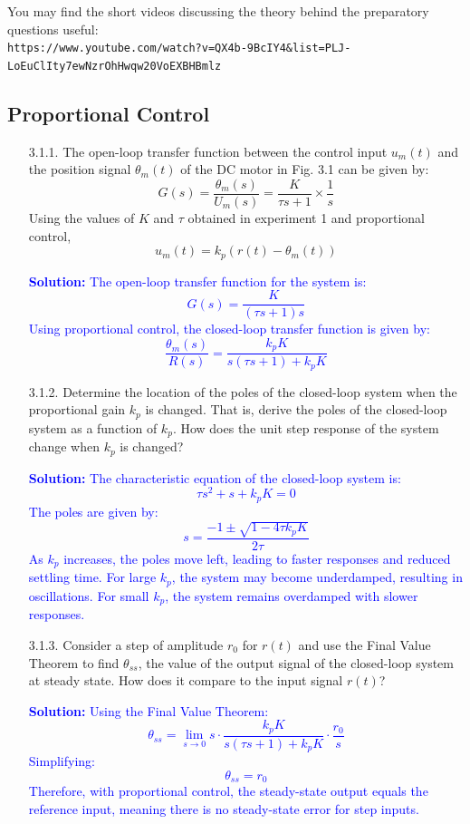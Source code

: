 \documentclass{article}
\begin{document}
You may find the short videos discussing the theory behind the preparatory questions useful: \\
\texttt{https://www.youtube.com/watch?v=QX4b-9BcIY4\&list=PLJ-LoEuClIty7ewNzrOhHwqw20VoEXBHBmlz}

\subsection{Proportional Control}
\begin{itemize}
    \item[3.1.1.] The open-loop transfer function between the control input $u_m(t)$ and the position signal $\theta_m(t)$ of the DC motor in Fig. 3.1 can be given by:
    \begin{equation}
        G(s) = \frac{\theta_m(s)}{U_m(s)} = \frac{K}{\tau s + 1} \times \frac{1}{s}
    \end{equation}
    Using the values of $K$ and $\tau$ obtained in experiment 1 and proportional control,
    \begin{equation}
        u_m(t) = k_p (r(t) - \theta_m(t))
    \end{equation}

    \textcolor{blue}{\textbf{Solution:} The open-loop transfer function for the system is:
    \[
    G(s) = \frac{K}{(\tau s + 1) s}
    \]
    Using proportional control, the closed-loop transfer function is given by:
    \[
    \frac{\theta_m(s)}{R(s)} = \frac{k_p K}{s(\tau s + 1) + k_p K}
    \]}

    \item[3.1.2.] Determine the location of the poles of the closed-loop system when the proportional gain $k_p$ is changed. That is, derive the poles of the closed-loop system as a function of $k_p$. How does the unit step response of the system change when $k_p$ is changed?

    \textcolor{blue}{\textbf{Solution:} The characteristic equation of the closed-loop system is:
    \[
    \tau s^2 + s + k_p K = 0
    \]
    The poles are given by:
    \[
    s = \frac{-1 \pm \sqrt{1 - 4\tau k_p K}}{2\tau}
    \]
    As $k_p$ increases, the poles move left, leading to faster responses and reduced settling time. For large $k_p$, the system may become underdamped, resulting in oscillations. For small $k_p$, the system remains overdamped with slower responses.}

    \item[3.1.3.] Consider a step of amplitude $r_0$ for $r(t)$ and use the Final Value Theorem to find $\theta_{ss}$, the value of the output signal of the closed-loop system at steady state. How does it compare to the input signal $r(t)$?

    \textcolor{blue}{\textbf{Solution:} Using the Final Value Theorem:
    \[
    \theta_{ss} = \lim_{s \to 0} s \cdot \frac{k_p K}{s(\tau s + 1) + k_p K} \cdot \frac{r_0}{s}
    \]
    Simplifying:
    \[
    \theta_{ss} = r_0
    \]
    Therefore, with proportional control, the steady-state output equals the reference input, meaning there is no steady-state error for step inputs.}
\end{itemize}
\end{document}
